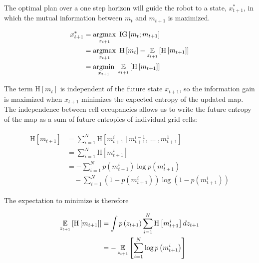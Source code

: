 \documentclass[conference]{IEEEtran}
\begin{document}
The optimal plan over a one step horizon will guide the robot to a state, $x_{t+1}^{*}$, in which the mutual information between $m_{t}$ and $m_{t+1}$ is maximized.

\begin{align} \begin{split}
    x_{t+1}^{*}
    &=
    \argmax_{x_{t+1}}
    \
    \text{IG}\left[
        m_{t}
        ;
        m_{t+1}
    \right]
    \\
    &=
    \argmax_{x_{t+1}}
    \
    \text{H}\left[
        m_{t}
    \right]
    -
    \expect_{z_{t+1}}\left[
        \text{H}\left[
            m_{t+1}
        \right]
    \right]
    \\
    &=
    \argmin_{x_{t+1}}
    \
    \expect_{z_{t+1}}\left[
        \text{H}\left[
            m_{t+1}
        \right]
    \right]
\end{split} \end{align}

The term $\text{H}\left[m_{t}\right]$ is independent of the future state $x_{t+1}$, so the information gain is maximized when $x_{t+1}$ minimizes the expected entropy of the updated map. The independence between cell occupancies allows us to write the future entropy of the map as a sum of future entropies of individual grid cells:

\begin{align} \begin{split}
    \text{H}\left[
        m_{t+1}
    \right]
    &=
    \sum_{i=1}^{N}
    \text{H}\left[
        m_{t+1}^{i}
        \ \vert \
        m_{t+1}^{i-1}
        , \
        \dots
        \ ,
        m_{t+1}^{1}
    \right]
    \\
    &=
    \sum_{i=1}^{N}
    \text{H}\left[
        m_{t+1}^{i}
    \right]
   \\
   &=
   -\sum_{i=1}^{N}
   p\left(m_{t+1}^{i}\right)
   \log p\left(m_{t+1}^{i}\right)
   \\
   &\quad
   -\sum_{i=1}^{N}
   \left( 1 - p\left(m_{t+1}^{i}\right) \right)
   \log \left( 1 - p\left(m_{t+1}^{i}\right) \right)
\end{split} \end{align}

The expectation to minimize is therefore

\begin{align} \begin{split}
    \expect_{z_{t+1}}\left[
        \text{H}\left[
            m_{t+1}
        \right]
    \right]
    &=
    \int
    p\left(
        z_{t+1}
    \right)
    \sum_{i=1}^{N}
    \text{H}\left[
        m_{t+1}^{i}
    \right]
    dz_{t+1}
    \\
    &=
    -\expect_{z_{t+1}}\left[
        \sum_{i=1}^{N}
        \log p\left(
            m_{t+1}^{i}
        \right)
    \right]
\end{split} \end{align}
\end{document}
